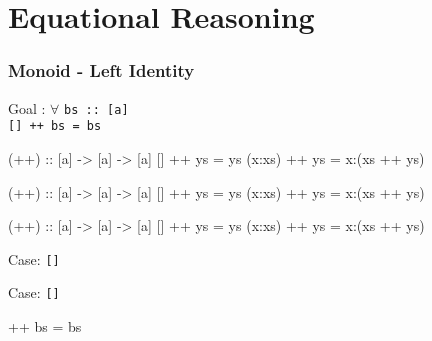\documentclass{beamer}
\newcommand{\ca}[1]{{\color{blue}#1}}
\newcommand{\cb}[1]{{\color{violet}#1}}
\newcommand{\ce}[1]{{\color{green!50!black}#1}}
\begin{document}
\section{Equational Reasoning}

\begin{frame}[t,fragile]
    \frametitle {Monoid - Left Identity}

\begingroup
\color{gray}\fontsize{10}{9.8}\selectfont

Goal : $\forall$ \verb?bs :: [a]? \\
    \quad \alert<2>{\Verb?[] ++ bs = bs?}

\vspace{10pt}

\begin{overprint}

\begin{semiverbatim}
(++) :: [a] -> [a] -> [a]
[]     ++ ys = ys
(x:xs) ++ ys = x:(xs ++ ys)
\end{semiverbatim}

\begin{semiverbatim}
(++) :: [a] -> [a] -> [a]
\ca{[]}     ++ \cb{ys} = ys
(x:xs) ++ ys = x:(xs ++ ys)
\end{semiverbatim}

\begin{semiverbatim}
(++) :: [a] -> [a] -> [a]
\ca{[]}     ++ \cb{ys} = \cb{ys}
(x:xs) ++ ys = x:(xs ++ ys)
\end{semiverbatim}

\end{overprint}

\endgroup

\vspace{10pt}

\begin{overprint}

Case: \ce{\Verb?[]?}

Case: \ce{\Verb?[]?} \checkmark

\end{overprint}

\vspace{5pt}

\begin{center}
\begin{overprint}

\begin{semiverbatim}
[] ++ bs = bs
\end{semiverbatim}


\end{overprint}
\end{center}
\end{frame}
\end{document}
